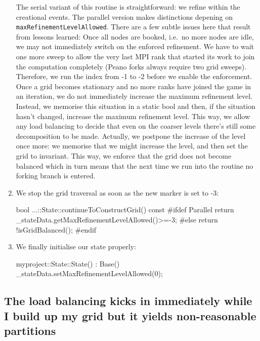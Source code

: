 \begin{enumerate}
  \noindent
  The serial variant of this routine is straightforward: we refine within the
  creational events. The parallel version makes distinctions depening on
  \texttt{maxRefinementLevelAllowed}.
  There are a few subtle issues here that result from lessons learned:
  Once all nodes are booked, i.e.~no more nodes are idle, we may not immediately
  switch on the enforced refinement. We have to wait one more sweep to allow the
  very last MPI rank that started its work to join the computation completely
  (Peano forks always require two grid sweeps). Therefore, we run the index from
  -1 to -2 before we enable the enforcement. Once a grid becomes stationary and
  no more ranks have joined the game in an iteration, we do not immediately
  increase the maximum refinement level. Instead, we memorise this situation in
  a static bool and then, if the situation hasn't changed, increase the maximum
  refinement level. This way, we allow any load balancing to decide that even on
  the coarser levels there's still some decomposition to be made. Actually, we
  postpone the increase of the level once more: we memorise that we might
  increase the level, and then set the grid to invariant. This way, we enforce
  that the grid does not become balanced which in turn means that the next time
  we run into the routine no forking branch is entered.
  
 \item We stop the grid traversal as soon as the new marker is set to
 -3:
  \begin{code}
bool ...::State::continueToConstructGrid() const {
  #ifdef Parallel
  return _stateData.getMaxRefinementLevelAllowed()>=-3;
  #else
  return !isGridBalanced();
  #endif
}
  \end{code}
  
  \item We finally initialise our state properly:
  \begin{code}
myproject::State::State() : Base() {
  _stateData.setMaxRefinementLevelAllowed(0);
}
  \end{code}
\end{enumerate}



\subsection{The load balancing kicks in immediately while I build up my grid but it
yields non-reasonable partitions}


